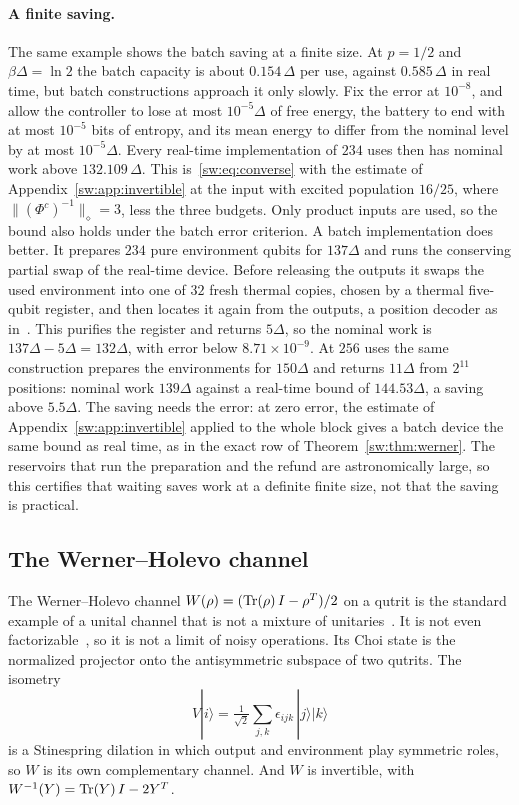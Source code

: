 \paragraph{A finite saving.} The same example shows the batch saving at a finite size. At $p=1/2$ and $\beta\Delta=\ln2$ the batch capacity is about $0.154\,\Delta$ per use, against $0.585\,\Delta$ in real time, but batch constructions approach it only slowly. Fix the error at $10^{-8}$, and allow the controller to lose at most $10^{-5}\Delta$ of free energy, the battery to end with at most $10^{-5}$ bits of entropy, and its mean energy to differ from the nominal level by at most $10^{-5}\Delta$. Every real-time implementation of $234$ uses then has nominal work above $132.109\,\Delta$. This is~\eqref{sw:eq:converse} with the estimate of Appendix~\ref{sw:app:invertible} at the input with excited population $16/25$, where $\|(\Phi^c)^{-1}\|_\diamond=3$, less the three budgets. Only product inputs are used, so the bound also holds under the batch error criterion. A batch implementation does better. It prepares $234$ pure environment qubits for $137\Delta$ and runs the conserving partial swap of the real-time device. Before releasing the outputs it swaps the used environment into one of $32$ fresh thermal copies, chosen by a thermal five-qubit register, and then locates it again from the outputs, a position decoder as in~\cite[Sec.~7]{FBB21}. This purifies the register and returns $5\Delta$, so the nominal work is $137\Delta-5\Delta=132\Delta$, with error below $8.71\times10^{-9}$. At $256$ uses the same construction prepares the environments for $150\Delta$ and returns $11\Delta$ from $2^{11}$ positions: nominal work $139\Delta$ against a real-time bound of $144.53\Delta$, a saving above $5.5\Delta$. The saving needs the error: at zero error, the estimate of Appendix~\ref{sw:app:invertible} applied to the whole block gives a batch device the same bound as real time, as in the exact row of Theorem~\ref{sw:thm:werner}. The reservoirs that run the preparation and the refund are astronomically large, so this certifies that waiting saves work at a definite finite size, not that the saving is practical.

\subsection{The Werner--Holevo channel}\label{sw:sec:werner}

The Werner--Holevo channel $W(\rho)=(\operatorname{Tr}(\rho)\,I-\rho^T)/2$ on a qutrit is the standard example of a unital channel that is not a mixture of unitaries~\cite{LandauStreater93}. It is not even factorizable~\cite[Ex.~3.1]{HaagerupMusat11}, so it is not a limit of noisy operations. Its Choi state is the normalized projector onto the antisymmetric subspace of two qutrits. The isometry
\[
V|i\rangle=\tfrac{1}{\sqrt2}\sum_{j,k}\epsilon_{ijk}\,|j\rangle|k\rangle
\]
is a Stinespring dilation in which output and environment play symmetric roles, so $W$ is its own complementary channel. And $W$ is invertible, with $W^{-1}(Y)=\operatorname{Tr}(Y)\,I-2Y^T$.

